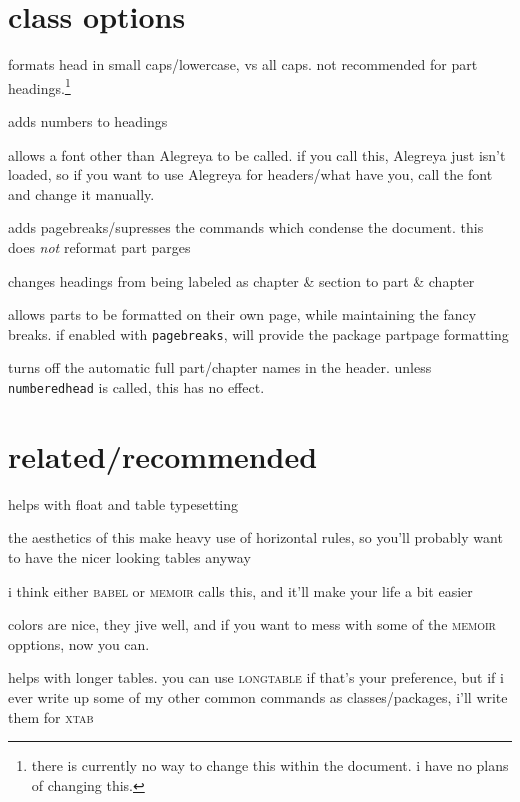 \documentclass[lowerhead,12pt]{aesthetic}
\begin{document}
\section{class options}\label{sec:aesop}
\begin{description}[font=\ttfamily]
    \item[lowerhead] formats head in small caps/lowercase, vs all caps. not recommended for part headings.\footnote{there is currently no way to change this within the document. i have no plans of changing this.}
    \item[numberedhead] adds numbers to headings\footnotemark[\thefootnote]
    \item[otherfont] allows a font other than Alegreya to be called. if you call this, Alegreya just isn't loaded, so if you want to use Alegreya for headers/what have you, call the font and change it manually.
    \item[pagebreaks] adds pagebreaks/supresses the commands which condense the document. this does \emph{not} reformat part parges
    \item[partheadings] changes headings from being labeled as chapter \& section to part \& chapter\footnotemark[\thefootnote]
    \item[partpages] allows parts to be formatted on their own page, while maintaining the fancy breaks. if enabled with \texttt{pagebreaks}, will provide the package partpage formatting
    \item[shortnames] turns off the automatic full part/chapter names in the header. unless \texttt{numberedhead} is called, this has no effect.
\end{description}

\section{related/recommended}
\begin{description}[font=\normalfont\scshape\ttfamily]
    \item[afterpage] helps with float and table typesetting
    \item[booktabs] the aesthetics of this make heavy use of horizontal rules, so you'll probably want to have the nicer looking tables anyway
    \item[csquotes] i think either {\scshape\ttfamily babel} or {\scshape\ttfamily memoir} calls this, and it'll make your life a bit easier
    \item[xcolor] colors are nice, they jive well, and if you want to mess with some of the {\scshape\ttfamily memoir} opptions, now you can.
    \item[xtab] helps with longer tables. you can use {\scshape\ttfamily longtable} if that's your preference, but if i ever write up some of my other common commands as classes/packages, i'll write them for {\scshape\ttfamily xtab}
\end{description}
\end{document}
